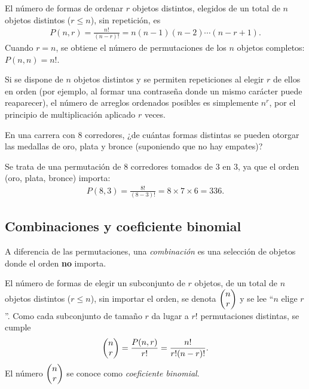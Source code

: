 \begin{definicion}
	El número de formas de ordenar $r$ objetos distintos, elegidos de un total de $n$ objetos distintos ($r \leq n$), sin repetición, es
	\begin{align}
		\label{eq:conteo.2}
		P(n,r) = \frac{n!}{(n-r)!} = n(n-1)(n-2)\cdots(n-r+1).
	\end{align}
	Cuando $r=n$, se obtiene el número de permutaciones de los $n$ objetos completos: $P(n,n) = n!$.
\end{definicion}

\begin{observacion}
	Si se dispone de $n$ objetos distintos y se permiten repeticiones al elegir $r$ de ellos en orden (por ejemplo, al formar una contraseña donde un mismo carácter puede reaparecer), el número de arreglos ordenados posibles es simplemente $n^r$, por el principio de multiplicación aplicado $r$ veces.
\end{observacion}

\begin{ejemplo}
	\label{exmp:conteo.2}
	En una carrera con $8$ corredores, ¿de cuántas formas distintas se pueden otorgar las medallas de oro, plata y bronce (suponiendo que no hay empates)?
\end{ejemplo}

\begin{solucion}
	Se trata de una permutación de $8$ corredores tomados de $3$ en $3$, ya que el orden (oro, plata, bronce) importa:
	\begin{align}
		P(8,3) = \frac{8!}{(8-3)!} = 8 \times 7 \times 6 = 336.
	\end{align}
\end{solucion}

\subsection{Combinaciones y coeficiente binomial}

A diferencia de las permutaciones, una \emph{combinación} es una selección de objetos donde el orden \textbf{no} importa.

\begin{definicion}
	El número de formas de elegir un subconjunto de $r$ objetos, de un total de $n$ objetos distintos ($r \leq n$), sin importar el orden, se denota $\begin{pmatrix} n \\ r\end{pmatrix}$ y se lee ``$n$ elige $r$''. Como cada subconjunto de tamaño $r$ da lugar a $r!$ permutaciones distintas, se cumple
	\begin{align}
		\label{eq:conteo.3}
		\begin{pmatrix} n \\ r\end{pmatrix} = \frac{P(n,r)}{r!} = \frac{n!}{r!(n-r)!}.
	\end{align}
	El número $\begin{pmatrix} n \\ r\end{pmatrix}$ se conoce como \emph{coeficiente binomial}.
\end{definicion}

